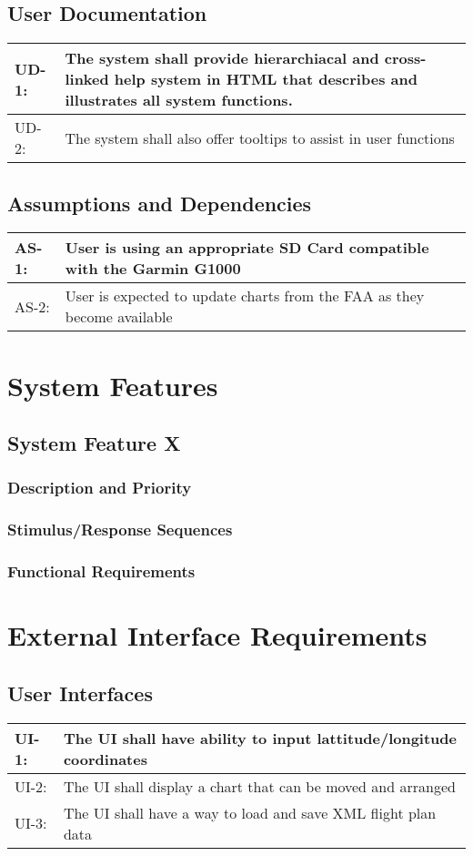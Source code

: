 \documentclass[12pt, letterpaper]{article}
\begin{document}
  \subsection{User Documentation}
    \begin{tabularx}{\textwidth}{|l|X|}
      \hline
      UD-1: & The system shall provide hierarchiacal and cross-linked help system in HTML that 
              describes and illustrates all system functions.\\ \hline
      UD-2: & The system shall also offer tooltips to assist in user functions \\
      \hline
    \end{tabularx}
  \subsection{Assumptions and Dependencies}
    \begin{tabularx}{\textwidth}{|l|X|}
      \hline
      AS-1: & User is using an appropriate SD Card compatible with the Garmin G1000\\ \hline
      AS-2: & User is expected to update charts from the FAA as they become available\\
      \hline
    \end{tabularx}

\section{System Features}
  \subsection{System Feature X}
    \subsubsection{Description and Priority}
    \subsubsection{Stimulus/Response Sequences}
    \subsubsection{Functional Requirements}

\section{External Interface Requirements}
  \subsection{User Interfaces}
    \begin{tabularx}{\textwidth}{|l|X|}
      \hline
      UI-1: & The UI shall have ability to input lattitude/longitude coordinates\\ \hline
      UI-2: & The UI shall display a chart that can be moved and arranged\\ \hline
      UI-3: & The UI shall have a way to load and save XML flight plan data\\ \hline
    \end{tabularx}
\end{document}
